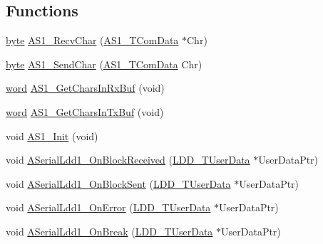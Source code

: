 \subsection*{Functions}
\begin{DoxyCompactItemize}
\item 
\hyperlink{group___p_e___types__module_ga0c8186d9b9b7880309c27230bbb5e69d}{byte} \hyperlink{group___a_s1__module_ga9b8f8ba49f2260fa77c5dc04d6d0b19c}{A\+S1\+\_\+\+Recv\+Char} (\hyperlink{group___a_s1__module_ga621222f7d90195f6b0edb2abeb534e3b}{A\+S1\+\_\+\+T\+Com\+Data} $\ast$Chr)
\item 
\hyperlink{group___p_e___types__module_ga0c8186d9b9b7880309c27230bbb5e69d}{byte} \hyperlink{group___a_s1__module_gadd3d17688519945b315fcc55a5459f92}{A\+S1\+\_\+\+Send\+Char} (\hyperlink{group___a_s1__module_ga621222f7d90195f6b0edb2abeb534e3b}{A\+S1\+\_\+\+T\+Com\+Data} Chr)
\item 
\hyperlink{group___p_e___types__module_ga285e72252c100e2508e4e933a0738f2b}{word} \hyperlink{group___a_s1__module_ga7f982fbc183fdc49ae898b0cc9a05b4d}{A\+S1\+\_\+\+Get\+Chars\+In\+Rx\+Buf} (void)
\item 
\hyperlink{group___p_e___types__module_ga285e72252c100e2508e4e933a0738f2b}{word} \hyperlink{group___a_s1__module_gada23618356da6913f8709b30d4defef6}{A\+S1\+\_\+\+Get\+Chars\+In\+Tx\+Buf} (void)
\item 
void \hyperlink{group___a_s1__module_ga38b6ab56f67ae07e420858f55a8aa7a1}{A\+S1\+\_\+\+Init} (void)
\item 
void \hyperlink{group___a_s1__module_ga617597f21766b4f72d7f2883c21e6dd8}{A\+Serial\+Ldd1\+\_\+\+On\+Block\+Received} (\hyperlink{group___p_e___types__module_ga0b66a73f87238a782318aa0be7578e35}{L\+D\+D\+\_\+\+T\+User\+Data} $\ast$User\+Data\+Ptr)
\item 
void \hyperlink{group___a_s1__module_ga5b8a51aef1d1fede97ee58e31c945b78}{A\+Serial\+Ldd1\+\_\+\+On\+Block\+Sent} (\hyperlink{group___p_e___types__module_ga0b66a73f87238a782318aa0be7578e35}{L\+D\+D\+\_\+\+T\+User\+Data} $\ast$User\+Data\+Ptr)
\item 
void \hyperlink{group___a_s1__module_gab11d6ff796e37ab8d6c35dd8cc258f9a}{A\+Serial\+Ldd1\+\_\+\+On\+Error} (\hyperlink{group___p_e___types__module_ga0b66a73f87238a782318aa0be7578e35}{L\+D\+D\+\_\+\+T\+User\+Data} $\ast$User\+Data\+Ptr)
\item 
void \hyperlink{group___a_s1__module_gaff0fe796ad334f68b2a86273f5ade786}{A\+Serial\+Ldd1\+\_\+\+On\+Break} (\hyperlink{group___p_e___types__module_ga0b66a73f87238a782318aa0be7578e35}{L\+D\+D\+\_\+\+T\+User\+Data} $\ast$User\+Data\+Ptr)
\end{DoxyCompactItemize}
